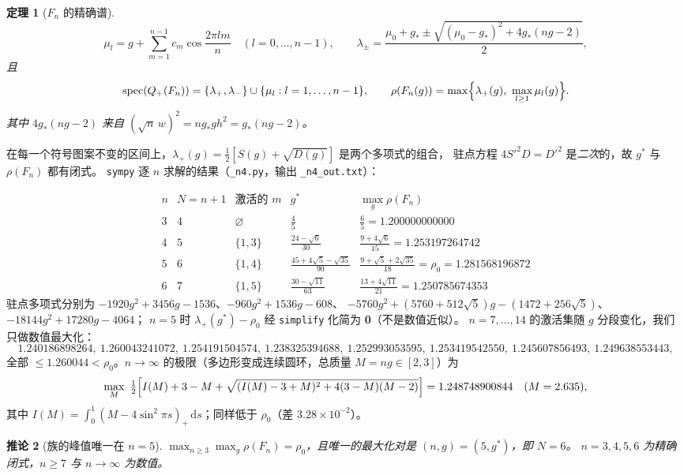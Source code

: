 \documentclass[UTF8,11pt]{ctexart}
\newtheorem{theorem}{定理}[section]
\newtheorem{corollary}[theorem]{推论}
\theoremstyle{definition}
\newcommand{\dd}{\,\mathrm{d}}
\begin{document}
\begin{theorem}[$F_n$ 的精确谱]\label{thm:Fn}
\[
\mu_l=g+\sum_{m=1}^{n-1}c_m\cos\frac{2\pi lm}n\quad(l=0,\dots,n-1),\qquad
\lambda_\pm=\frac{\mu_0+g_*\pm\sqrt{(\mu_0-g_*)^2+4g_*(ng-2)}}2 ,
\]
且
\[
\mathrm{spec}(Q_+(F_n))=\{\lambda_+,\lambda_-\}\cup\{\mu_l:l=1,\dots,n-1\},\qquad
\rho(F_n(g))=\max\Bigl\{\lambda_+(g),\ \max_{l\ge1}\mu_l(g)\Bigr\}.
\]
其中 $4g_*(ng-2)$ 来自 $(\sqrt n\,w)^2=ng_*gh^2=g_*(ng-2)$。
\end{theorem}

在每一个符号图案不变的区间上，$\lambda_+(g)=\frac12[S(g)+\sqrt{D(g)}]$ 是两个多项式的组合，
驻点方程 $4S'^2D=D'^2$ 是\emph{二次}的，故 $g^*$ 与 $\rho(F_n)$ 都有闭式。
\texttt{sympy} 逐 $n$ 求解的结果（\texttt{\_n4.py}，输出 \texttt{\_n4\_out.txt}）：

\[
\begin{array}{c|c|c|c|c}
n&N=n+1&\text{激活的 }m&g^*&\max_g\rho(F_n)\\ \hline
3&4&\varnothing&\frac45&\frac65=1.200000000000\\
4&5&\{1,3\}&\frac{24-\sqrt6}{30}&\frac{9+4\sqrt6}{15}=1.253197264742\\
5&6&\{1,4\}&\frac{45+4\sqrt5-\sqrt{35}}{90}&\frac{9+\sqrt5+2\sqrt{35}}{18}=\rho_0=1.281568196872\\
6&7&\{1,5\}&\frac{30-\sqrt{11}}{63}&\frac{13+4\sqrt{11}}{21}=1.250785674353
\end{array}
\]
驻点多项式分别为 $-1920g^2+3456g-1536$、$-960g^2+1536g-608$、
$-5760g^2+(5760+512\sqrt5)g-(1472+256\sqrt5)$、$-18144g^2+17280g-4064$；
$n=5$ 时 $\lambda_+(g^*)-\rho_0$ 经 \texttt{simplify} 化简为 \textbf{0}（不是数值近似）。
$n=7,\dots,14$ 的激活集随 $g$ 分段变化，我们只做数值最大化：
\[
1.240186898264,\ 1.260043241072,\ 1.254191504574,\ 1.238325394688,\
1.252993053595,\ 1.253419542550,\ 1.245607856493,\ 1.249638553443 ,
\]
全部 $\le1.260044<\rho_0$。$n\to\infty$ 的极限（多边形变成连续圆环，总质量 $M=ng\in[2,3]$）为
\[
\max_M\ \tfrac12\Bigl[I(M)+3-M+\sqrt{(I(M)-3+M)^2+4(3-M)(M-2)}\Bigr]=1.248748900844\quad(M=2.635),
\]
其中 $I(M)=\int_0^1(M-4\sin^2\pi s)_+\dd s$；同样低于 $\rho_0$（差 $3.28\times10^{-2}$）。

\begin{corollary}[族的峰值唯一在 $n=5$]\label{cor:Fnpeak}
$\max_{n\ge3}\max_g\rho(F_n)=\rho_0$，且唯一的最大化对是 $(n,g)=(5,g^*)$，即 $N=6$。
$n=3,4,5,6$ 为精确闭式，$n\ge7$ 与 $n\to\infty$ 为数值。
\end{corollary}
\end{document}
